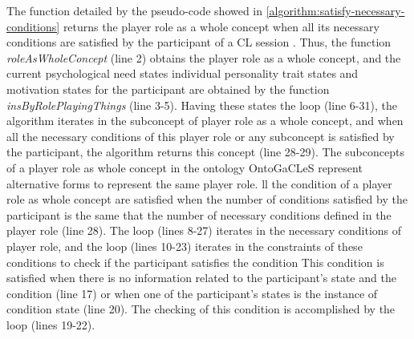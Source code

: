  The function detailed by the pseudo-code showed in \autoref{algorithm:satisfy-necessary-conditions} returns the player role as a whole concept when all its necessary conditions are satisfied by the participant  of a CL session .
Thus, the function \emph{roleAsWholeConcept} (line 2) obtains the player role as a whole concept, and the current psychological need states  individual personality trait states  and   motivation states for the participant are obtained by the function \emph{insByRolePlayingThings} (line 3-5).
Having these states the loop  (line 6-31), the algorithm iterates in the subconcept of player role as a whole concept, and when all the necessary conditions of this player role or any subconcept is satisfied by the participant, the algorithm returns this concept (line 28-29).
The subconcepts of a player role as whole concept in the ontology OntoGaCLeS represent alternative forms to represent the same player role. 
ll the condition of a player role as whole concept are satisfied when the number of conditions  satisfied by the participant  is the same that the number of necessary conditions defined in the player role (line 28).
The loop  (lines 8-27) iterates in the necessary conditions of player role, and the loop  (lines 10-23) iterates in the constraints of these conditions to check if the participant  satisfies the condition 
This condition is satisfied when there is no information related to the participant's state and the condition (line 17) or when one of the participant's states is the instance of condition state (line 20).
The checking of this condition is accomplished by the loop  (lines 19-22).

